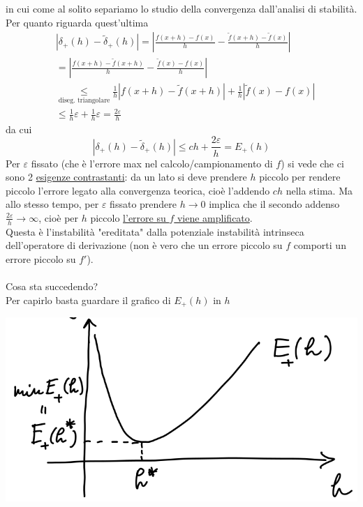 \documentclass[12pt,a4paper]{article}
\begin{document}
in cui come al solito separiamo lo studio della convergenza dall'analisi di stabilità.\\
Per quanto riguarda quest'ultima
\begin{equation*}
    \begin{split}
        & |\delta_+(h)-\tilde{\delta}_+(h)| = | \frac{f(x+h) - f(x)}{h} - \frac{\tilde{f}(x+h) - \tilde{f}(x)}{h}| \\
        & = | \frac{f(x+h) - \tilde{f}(x+h)}{h} - \frac{\tilde{f}(x) - f(x)}{h}| \\
        & \underset{\text{diseg. triangolare}}{\leq} \frac{1}{h}|f(x+h) - \tilde{f}(x+h)| + \frac{1}{h}|\tilde{f}(x) - f(x)| \\
        & \leq \frac{1}{h}\varepsilon + \frac{1}{h}\varepsilon = \frac{2\varepsilon}{h}
    \end{split}
\end{equation*}
da cui 
\begin{equation*}
    |\delta_+(h)-\tilde{\delta}_+(h)| \leq ch+\frac{2\varepsilon}{h} = E_+(h)
\end{equation*}
Per $\varepsilon$ fissato (che è l'errore max nel calcolo/campionamento di $f$) si vede che ci sono 2 \underline{esigenze
contrastanti}: da un lato si deve prendere $h$ piccolo per rendere piccolo l'errore legato alla convergenza teorica, cioè l'addendo $ch$ nella stima. Ma allo stesso tempo, per $\varepsilon$ fissato prendere $h \rightarrow 0$ implica che il secondo addenso $\frac{2\varepsilon}{h}\rightarrow \infty$, cioè per $h$ piccolo \underline{l'errore su $f$ viene amplificato}.\\
Questa è l'instabilità "ereditata" dalla potenziale instabilità intrinseca dell'operatore di derivazione (non è vero che
un errore piccolo su $f$ comporti un errore piccolo su $f'$).\\
\vspace{0.1cm}
\\
Cosa sta succedendo? \\
Per capirlo basta guardare il grafico di $E_+(h)$ in $h$
\begin{center}
    \includegraphics[scale=0.5]{pag15.png}    
\end{center}
\end{document}
